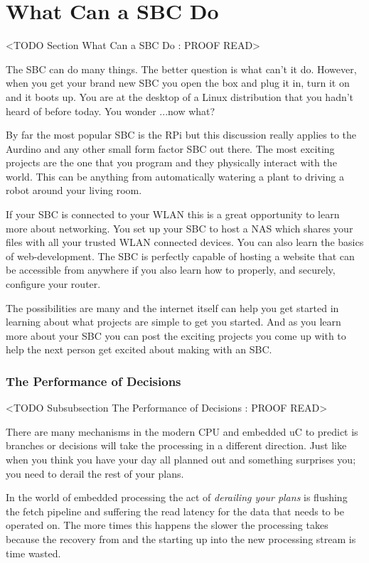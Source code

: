 \section{What Can a SBC Do}
	<TODO Section What Can a SBC Do : PROOF READ>

The \ac{SBC} can do many things. The better question is what can't it do. However, when you get your brand new \ac{SBC} you open the box and plug it in, turn it on and it boots up. You are at the desktop of a Linux distribution that you hadn't heard of before today. You wonder ...now what?

By far the most popular \ac{SBC} is the \ac{RPi} but this discussion really applies to the Aurdino and any other small form factor \ac{SBC} out there. The most exciting projects are the one that you program and they physically interact with the world. This can be anything from automatically watering a plant to driving a robot around your living room.

If your \ac{SBC} is connected to your \ac{WLAN} this is a great opportunity to learn more about networking. You set up your \ac{SBC} to host a \ac{NAS} which shares your files with all your trusted \ac{WLAN} connected devices. You can also learn the basics of web-development. The \ac{SBC} is perfectly capable of hosting a website that can be accessible from anywhere if you also learn how to properly, and securely, configure your router.

The possibilities are many and the internet itself can help you get started in learning about what projects are simple to get you started. And as you learn more about your \ac{SBC} you can post the exciting projects you come up with to help the next person get excited about making with an \ac{SBC}.
	
\subsubsection{The Performance of Decisions}
	<TODO Subsubsection  The Performance of Decisions : PROOF READ>

There are many mechanisms in the modern \ac{CPU} and embedded \ac{uC} to predict is branches or decisions will take the processing in a different direction. Just like when you think you have your day all planned out and something surprises you; you need to derail the rest of your plans.

In the world of embedded processing the act of \emph{derailing your plans} is flushing the fetch pipeline and suffering the read latency for the data that needs to be operated on. The more times this happens the slower the processing takes because the recovery from and the starting up into the new processing stream is time wasted.

